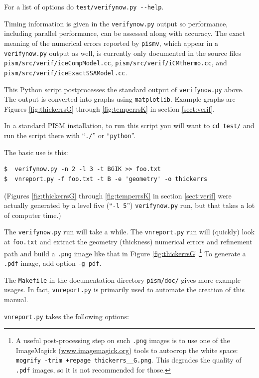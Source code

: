 \documentclass[11pt,final]{amsart}
\newcommand{\und}{\_\!\_}
\begin{document}
For a list of options do \verb|test/verifynow.py --help|.

Timing information is given in the \verb|verifynow.py| output so performance, including parallel performance, can be assessed along with accuracy.  The exact meaning of the numerical errors reported by \verb|pismv|, which appear in a \verb|verifynow.py| output as well, is currently only documented in the source files \verb|pism/src/verif/iceCompModel.cc|, \verb|pism/src/verif/iCMthermo.cc|, and \verb|pism/src/verif/iceExactSSAModel.cc|.  


  This Python script postprocesses the standard output of \verb|verifynow.py| above.  The output is converted into graphs using \verb|matplotlib|.  Example graphs are Figures \ref{fig:thickerrsG} through \ref{fig:temperrsK} in section \ref{sect:verif}.

In a standard PISM installation, to run this script you will want to \verb|cd test/| and run the script there with ``\verb|./|'' or ``\verb|python|''.

The basic use is this:

\begin{verbatim}
$  verifynow.py -n 2 -l 3 -t BGIK >> foo.txt
$  vnreport.py -f foo.txt -t B -e 'geometry' -o thickerrs
\end{verbatim}
(Figures \ref{fig:thickerrsG} through \ref{fig:temperrsK} in section \ref{sect:verif} were actually generated by a level five (``\verb|-l 5|'') \verb|verifynow.py| run, but that takes a lot of computer time.)

The \verb|verifynow.py| run will take a while.  The \verb|vnreport.py| run will (quickly) look at \verb|foo.txt| and extract the geometry (thickness) numerical errors and refinement path and build a \verb|.png| image like that in Figure \ref{fig:thickerrsG}.\footnote{A useful post-processing step on such \texttt{.png} images is to use one of the ImageMagick (\href{http://www.imagemagick.org/}{www.imagemagick.org}) tools to autocrop the white space: \texttt{mogrify -trim +repage thickerrs\und G.png}.  This degrades the quality of \texttt{.pdf} images, so it is not recommended for those.}  To generate a \verb|.pdf| image, add option \verb|-g pdf|.

The \verb|Makefile| in the documentation directory \verb|pism/doc/| gives more example usages.  In fact, \verb|vnreport.py| is primarily used to automate the creation of this manual.

\opthead  \verb|vnreport.py| takes the following options:
\end{document}
